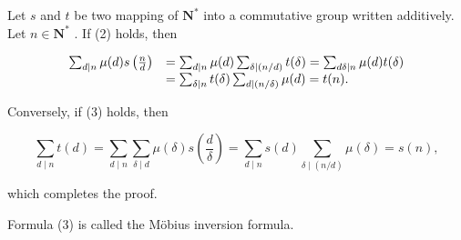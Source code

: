 Let \(s\) and \(t\) be two mapping of \(\mathbf{N}^*\) into a commutative group written additively. Let \(n \in \mathbf{N}^*\) . If (2) holds, then

\[
\begin{array}{r l} \sum_ {d | n} \mu (d) s \left(\frac {n}{d}\right) & = \sum_ {d | n} \mu (d) \sum_ {\delta \mid (n / d)} t (\delta) = \sum_ {d \delta | n} \mu (d) t (\delta) \\ & = \sum_ {\delta | n} t (\delta) \sum_ {d \mid (n / \delta)} \mu (d) = t (n). \end{array}
\]

Conversely, if (3) holds, then

\[
\sum_ {d \mid n} t (d) = \sum_ {d \mid n} \sum_ {\delta \mid d} \mu (\delta) s \left(\frac {d}{\delta}\right) = \sum_ {d \mid n} s (d) \sum_ {\delta \mid (n / d)} \mu (\delta) = s (n),
\]

which completes the proof.

Formula (3) is called the Möbius inversion formula.


